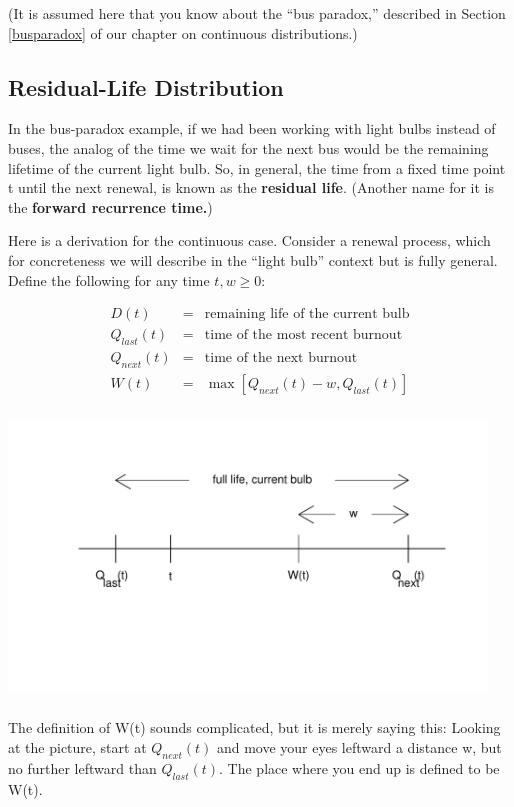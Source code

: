 (It is assumed here that you know about the ``bus paradox,'' described
in Section \ref{busparadox} of our chapter on continuous distributions.)

\subsection{Residual-Life Distribution}

In the bus-paradox example, if we had been working with light bulbs
instead of buses, the analog of the time we wait for the next bus would
be the remaining lifetime of the current light bulb. So, in general, the
time from a fixed time point t until the next renewal, is known as the
\textbf{residual life}.  (Another name for it is the \textbf{forward
recurrence time.}) 

Here is a derivation for the continuous case.  Consider a renewal
process, which for concreteness we will describe in the ``light bulb''
context but is fully general.  Define the following for any time $t,w
\geq 0$:

\begin{eqnarray}
D(t) &=& \textrm{remaining life of the current bulb} \\
Q_{last}(t) &=& \textrm{time of the most recent burnout} \\
Q_{next}(t) &=& \textrm{time of the next burnout} \\
W(t) &=& \max[Q_{next}(t) - w, Q_{last}(t)]
\end{eqnarray}

\includegraphics[height=3.0in,width=5.0in]{ResidLife.pdf}

The definition of W(t) sounds complicated, but it is merely saying this:
Looking at the picture, start at $Q_{next}(t)$ and move your eyes
leftward a distance w, but no further leftward than $Q_{last}(t)$.  The
place where you end up is defined to be W(t).

